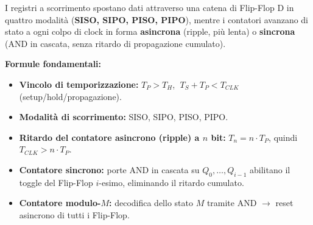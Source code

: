 \begin{important}
I registri a scorrimento spostano dati attraverso una catena di Flip-Flop D in quattro modalità (\textbf{SISO, SIPO, PISO, PIPO}), mentre i contatori avanzano di stato a ogni colpo di clock in forma \textbf{asincrona} (ripple, più lenta) o \textbf{sincrona} (AND in cascata, senza ritardo di propagazione cumulato).
\end{important}

\begin{note}
\textbf{Formule fondamentali:}
\begin{itemize}
    \item \textbf{Vincolo di temporizzazione:} $T_P > T_H$, $\; T_S + T_P < T_{CLK}$ (setup/hold/propagazione).
    \item \textbf{Modalità di scorrimento:} SISO, SIPO, PISO, PIPO.
    \item \textbf{Ritardo del contatore asincrono (ripple) a $n$ bit:} $T_n = n\cdot T_P$, quindi $T_{CLK} > n\cdot T_P$.
    \item \textbf{Contatore sincrono:} porte AND in cascata su $Q_0,\dots,Q_{i-1}$ abilitano il toggle del Flip-Flop $i$-esimo, eliminando il ritardo cumulato.
    \item \textbf{Contatore modulo-$M$:} decodifica dello stato $M$ tramite AND $\to$ reset asincrono di tutti i Flip-Flop.
\end{itemize}
\end{note}

